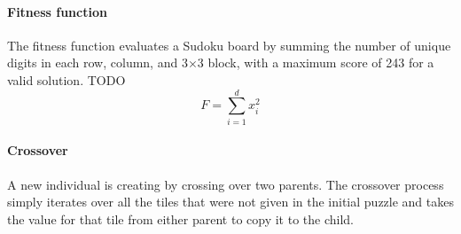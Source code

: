 \paragraph{Fitness function}\label{par:ff-impl1} The fitness function evaluates a Sudoku board by summing the number of unique digits in each row, column, and 3$\times$3 block, with a maximum score of 243 for a valid solution.
{
  \color{red} TODO
}
\begin{equation}
    F = \sum_{i=1}^d x_i^2 
\end{equation}

\paragraph{Crossover} A new individual is creating by crossing over two parents. The crossover process simply iterates over all the tiles that were not given in the initial puzzle and takes the value for that tile from either parent to copy it to the child.

